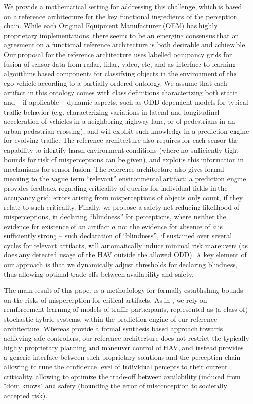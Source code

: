 We provide a mathematical setting for addressing this challenge, which is based on a reference architecture for the key functional ingredients of the perception chain. While each Original Equipment Manufacturer (OEM) has highly proprietary implementations, there seems to be an emerging consensus that an agreement on a functional reference architecture is both desirable and achievable. Our proposal for the reference architecture uses labelled occupancy grids for fusion of sensor data from radar, lidar, video, etc, and as interface to learning-algorithms based components for classifying objects in the environment of the ego-vehicle according to a partially ordered ontology. We assume that each artifact in this ontology comes with class definitions characterizing both static and -- if applicable -- dynamic aspects, such as ODD dependent models for typical traffic behavior (e.g. characterizing variations in lateral and longitudinal acceleration of vehicles in a neighboring highway lane, or of pedestrians in an urban pedestrian crossing), and will exploit such knowledge in a prediction engine for evolving traffic. The reference architecture also requires for each sensor the capability to identify harsh environment conditions (where no sufficiently tight bounds for risk of misperceptions can be given), and exploits this information in mechanisms for sensor fusion. The reference architecture also gives formal meaning to the vague term \enquote{relevant} environmental artifact: a prediction engine provides feedback regarding criticality of queries for individual fields in the occupancy grid: errors arising from misperceptions of objects only count, if they relate to such criticality. Finally, we propose a safety net reducing likelihood of misperceptions, in declaring \enquote{blindness} for perceptions, where neither the evidence for existence of an artifact $a$ nor the evidence for absence of $a$ is sufficiently strong -- such declaration of \enquote{blindness}, if sustained over several cycles for relevant artifacts, will automatically induce minimal risk maneuvers (as does any detected usage of the HAV outside the allowed ODD). A key element of our approach is that we dynamically adjust thresholds for declaring blindness, thus allowing optimal trade-offs between availability and safety.

The main result of this paper is a methodology for formally establishing bounds on the risks of misperception for critical artifacts. As in \cite{VitusTomlinCDC2013,galbas}, we rely on reinforcement learning of models of traffic participants, represented as (a class of) stochastic hybrid systems, within the prediction engine of our reference architecture. Whereas \cite{synthesisPerception}\cite{SeshiaNFM17} provide a formal synthesis
based approach towards achieving safe controllers, our reference architecture does not restrict the typically highly proprietary planning and maneuver control of HAV, and instead provides a generic interface between such proprietary solutions and the perception chain allowing to tune the confidence level of individual percepts to their current criticality, allowing to optimize the trade-off between availability (induced from "dont knows" and safety (bounding the error of misconception to societally accepted risk).

